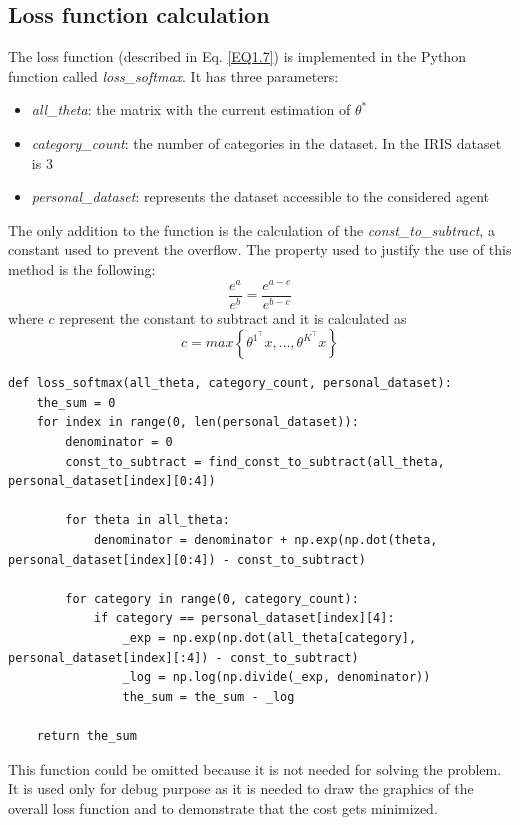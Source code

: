 \documentclass[a4paper,11pt,oneside]{book}
\begin{document}
\subsection{Loss function calculation}
The loss function (described in Eq. \ref{EQ1.7}) is implemented in the Python function called \textit{loss\_softmax}. It has three parameters:\\
\begin{itemize}
	\item \textit{all\_theta}: the matrix with the current estimation of $\theta^*$
	\item \textit{category\_count}: the number of categories in the dataset. In the IRIS dataset is $3$
	\item \textit{personal\_dataset}: represents the dataset accessible to the considered agent
\end{itemize}
The only addition to the function is the calculation of the \textit{const\_to\_subtract}, a constant used to prevent the overflow. The property used to justify the use of this method is the following:
\begin{equation}
	\dfrac{e^a}{e^b} = \dfrac{e^{a-c}}{e^{b-c}}
\end{equation}
where $c$ represent the constant to subtract and it is calculated as
\begin{equation}
	c = max \left\{ \theta^{1^\top}x, \dots,  \theta^{K^\top}x \right\}
\end{equation}

\begin{lstlisting}
def loss_softmax(all_theta, category_count, personal_dataset):
    the_sum = 0
    for index in range(0, len(personal_dataset)):
        denominator = 0
        const_to_subtract = find_const_to_subtract(all_theta, personal_dataset[index][0:4])
		
        for theta in all_theta:
            denominator = denominator + np.exp(np.dot(theta, personal_dataset[index][0:4]) - const_to_subtract)
		
        for category in range(0, category_count):
            if category == personal_dataset[index][4]:
                _exp = np.exp(np.dot(all_theta[category], personal_dataset[index][:4]) - const_to_subtract)
                _log = np.log(np.divide(_exp, denominator))
                the_sum = the_sum - _log
	
	return the_sum
\end{lstlisting}

This function could be omitted because it is not needed for solving the problem. It is used only for debug purpose as it is needed to draw the graphics of the overall loss function and to demonstrate that the cost gets minimized.
\end{document}
